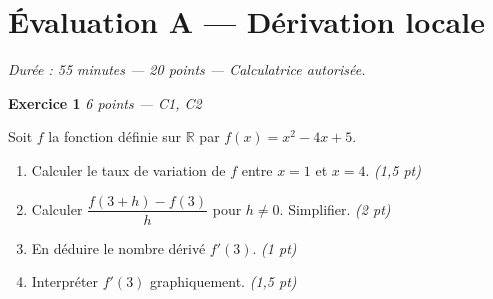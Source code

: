 
\section*{Évaluation A — Dérivation locale}

\textit{Durée : 55 minutes — 20 points — Calculatrice autorisée.}

\bigskip

\textbf{Exercice 1} \hfill \textit{6 points — C1, C2}

Soit $f$ la fonction définie sur $\mathbb{R}$ par $f(x) = x^2 - 4x + 5$.

\begin{enumerate}
  \item Calculer le taux de variation de $f$ entre $x = 1$ et $x = 4$. \hfill \textit{(1,5 pt)}
  \item Calculer $\dfrac{f(3+h)-f(3)}{h}$ pour $h
\neq 0$. Simplifier. \hfill \textit{(2 pt)}
  \item En déduire le nombre dérivé $f'(3)$. \hfill \textit{(1 pt)}
  \item Interpréter $f'(3)$ graphiquement. \hfill \textit{(1,5 pt)}
\end{enumerate}


\bigskip

